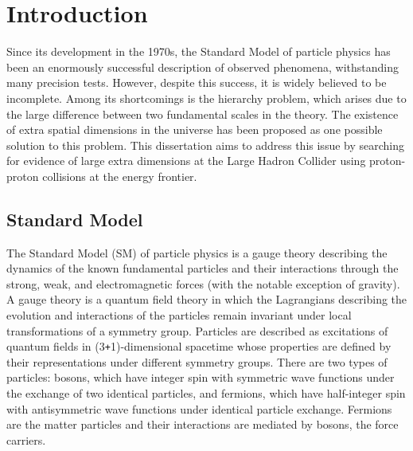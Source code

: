 \chapter{Introduction}\label{ch:intro}

Since its development in the 1970s, the Standard Model of particle physics has been an enormously successful description of observed phenomena, withstanding many precision tests. However, despite this success, it is widely believed to be incomplete. Among its shortcomings is the hierarchy problem, which arises due to the large difference between two fundamental scales in the theory. The existence of extra spatial dimensions in the universe has been proposed as one possible solution to this problem. This dissertation aims to address this issue by searching for evidence of large extra dimensions at the Large Hadron Collider using proton-proton collisions at the energy frontier.

\section{Standard Model}

The Standard Model (SM) of particle physics is a gauge theory describing the dynamics of the known fundamental particles and their interactions through the strong, weak, and electromagnetic forces (with the notable exception of gravity). A gauge theory is a quantum field theory in which the Lagrangians describing the evolution and interactions of the particles remain invariant under local transformations of a symmetry group. Particles are described as excitations of quantum fields in (3\texttt{+}1)-dimensional spacetime whose properties are defined by their representations under different symmetry groups. There are two types of particles: bosons, which have integer spin with symmetric wave functions under the exchange of two identical particles, and fermions, which have half-integer spin with antisymmetric wave functions under identical particle exchange. Fermions are the matter particles and their interactions are mediated by bosons, the force carriers.

